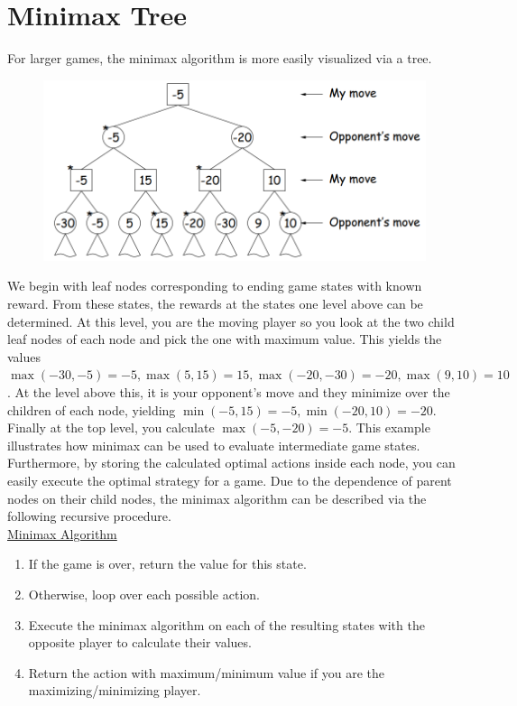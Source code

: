 \documentclass[12pt, letterpaper]{article}
\begin{document}
\section*{Minimax Tree}
For larger games, the minimax algorithm is more easily visualized via a tree.
\begin{figure}[H]
\centering
\includegraphics[scale=0.4]{minimax-tree.png}
\end{figure}
We begin with leaf nodes corresponding to ending game states with known reward. From these states, the rewards at the states one level above can be determined. At this level, you are the moving player so you look at the two child leaf nodes of each node and pick the one with maximum value. This yields the values $\max(-30, -5) = -5, \max(5, 15) = 15,\max(-20, -30) = -20,\max(9, 10) = 10$. At the level above this, it is your opponent's move and they minimize over the children of each node, yielding $\min(-5,15)=-5, \min(-20,10)=-20$. Finally at the top level, you calculate $\max(-5, -20) = -5$.
\newpage
This example illustrates how minimax can be used to evaluate intermediate game states. Furthermore, by storing the calculated optimal actions inside each node, you can easily execute the optimal strategy for a game. Due to the dependence of parent nodes on their child nodes, the minimax algorithm can be described via the following recursive procedure. \\[0.2cm]
\underline{Minimax Algorithm}
\begin{enumerate}
    \item If the game is over, return the value for this state.
    \item Otherwise, loop over each possible action.
    \item Execute the minimax algorithm on each of the resulting states with the opposite player to calculate their values.
    \item Return the action with maximum/minimum value if you are the maximizing/minimizing player.
\end{enumerate}
\end{document}

